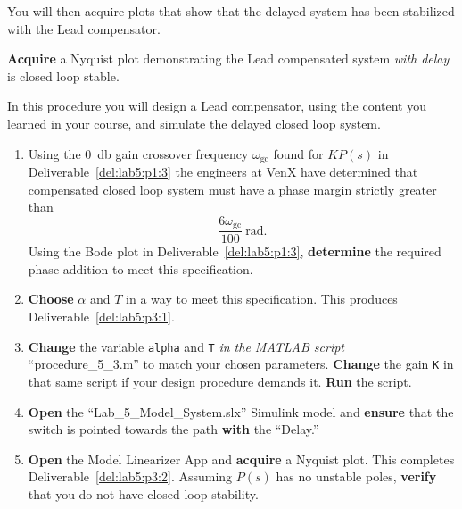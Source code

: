 %
You will then acquire plots that show that the delayed system has been stabilized with the Lead compensator.
%
\begin{deliverable}[label={del:lab5:p3:2}]
  \textbf{Acquire} a Nyquist plot demonstrating the Lead compensated system \emph{with delay} is closed loop stable.
\end{deliverable}
%
\begin{procedure}[label={proc:lab5:3}]
  In this procedure you will design a Lead compensator, using the content you learned in your course, and simulate the delayed closed loop system.
  \begin{enumerate}[label={(\arabic*)}]
    \item{%
      Using the \SI{0}{\decibel} gain crossover frequency \(\omega_\mathrm{gc}\) found for \(K P(s)\) in Deliverable~\ref{del:lab5:p1:3} the engineers at VenX have determined that compensated closed loop system must have a phase margin strictly greater than
      \[
        \frac{6\omega_\mathrm{gc}}{100}~\mathrm{rad}.
      \]
      Using the Bode plot in Deliverable~\ref{del:lab5:p1:3}, \textbf{determine} the required phase addition to meet this specification.
    }
    \item{%
      \textbf{Choose} \(\alpha\) and \(T\) in a way to meet this specification.
      This produces Deliverable~\ref{del:lab5:p3:1}.
    }
    \item{%
      \textbf{Change} the variable \texttt{alpha} and \texttt{T} \emph{in the MATLAB script} ``procedure\_5\_3.m'' to match your chosen parameters.
      \textbf{Change} the gain \texttt{K} in that same script if your design procedure demands it.
      \textbf{Run} the script.
    }
    \item{%
      \textbf{Open} the ``Lab\_5\_Model\_System.slx'' Simulink model and \textbf{ensure} that the switch is pointed towards the path \textbf{with} the ``Delay.''
    }
    \item{%
      \textbf{Open} the Model Linearizer App and \textbf{acquire} a Nyquist plot.
      This completes Deliverable~\ref{del:lab5:p3:2}.
      Assuming \(P(s)\) has no unstable poles, \textbf{verify} that you do not have closed loop stability.
    }
  \end{enumerate}
\end{procedure}

